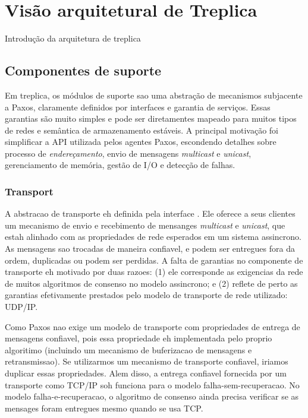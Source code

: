 \section{Visão arquitetural de Treplica}\label{sec:visao_arquitetural}

Introdução da arquitetura de treplica

\subsection{Componentes de suporte}

Em treplica, os módulos de suporte sao uma abstração de mecanismos subjacente a Paxos,
claramente definidos por interfaces e garantia de serviços. Essas garantias são muito
simples e pode ser diretamentes mapeado para muitos tipos de redes e semântica de
armazenamento estáveis. A principal motivação foi simplificar a API utilizada pelos
agentes Paxos, escondendo detalhes sobre processo de \emph{endereçamento}, envio de
mensagens \emph{multicast} e \emph{unicast}, gerenciamento de memória, gestão de I/O e
detecção de falhas.

\subsubsection{Transport}\label{subsec:transport}

A abstracao de transporte eh definida pela interface . Ele oferece a
seus clientes um mecanismo de envio e recebimento de mensanges \emph{multicast} e
\emph{unicast}, que estah alinhado com as propriedades de rede esperados em um sistema
assincrono. As mensagens sao trocadas de maneira confiavel, e podem ser entregues fora da
ordem, duplicadas ou podem ser perdidas. A falta de garantias no componente de transporte
eh motivado por duas razoes: (1) ele corresponde as exigencias da rede de muitos
algoritmos de consenso no modelo assincrono; e (2) reflete de perto as garantias
efetivamente prestados pelo modelo de transporte de rede utilizado: UDP/IP.

Como Paxos nao exige um modelo de transporte com propriedades de entrega de mensagens
confiavel, pois essa propriedade eh implementada pelo proprio algoritimo (incluindo um
mecanismo de buferizacao de mensagens e retransmissao). Se utilizarmos um mecanismo de
transporte confiavel, iriamos duplicar essas propriedades. Alem disso, a entrega confiavel
fornecida por um transporte como TCP/IP soh funciona para o modelo falha-sem-recuperacao.
No modelo falha-e-recuperacao, o algoritmo de consenso ainda precisa verificar se as
mensages foram entregues mesmo quando se usa TCP.

